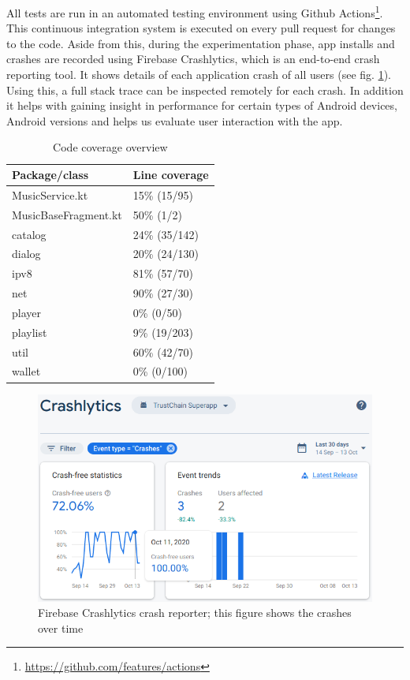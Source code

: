All tests are run in an automated testing environment using Github Actions\footnote{\url{https://github.com/features/actions}}. This continuous integration system is executed on every pull request for changes to the code. Aside from this, during the experimentation phase, app installs and crashes are recorded using Firebase Crashlytics, which is an end-to-end crash reporting tool. It shows details of each application crash of all users (see fig. \ref{fig:firebase-crashlytics}). Using this, a full stack trace can be inspected remotely for each crash. In addition it helps with gaining insight in performance for certain types of Android devices, Android versions and helps us evaluate user interaction with the app.

\begin{table}[]
\begin{tabular}{|l|l|}
\hline
\textbf{Package/class} & \textbf{Line coverage} \\ \hline
MusicService.kt        & 15\% (15/95)           \\ \hline
MusicBaseFragment.kt   & 50\% (1/2)             \\ \hline
catalog                & 24\% (35/142)          \\ \hline
dialog                 & 20\% (24/130)          \\ \hline
ipv8                   & 81\% (57/70)           \\ \hline
net                    & 90\% (27/30)           \\ \hline
player                 & 0\% (0/50)             \\ \hline
playlist               & 9\% (19/203)           \\ \hline
util                   & 60\% (42/70)           \\ \hline
wallet                 & 0\% (0/100)            \\ \hline
\end{tabular}
\caption{Code coverage overview}
\label{tab:code-cov}
\end{table}

\begin{figure}
    \includegraphics[width=0.8\linewidth]{implementation/firebase-crashlytics.png}
    \caption{Firebase Crashlytics crash reporter; this figure shows the crashes over time}
    \label{fig:firebase-crashlytics}
\end{figure}